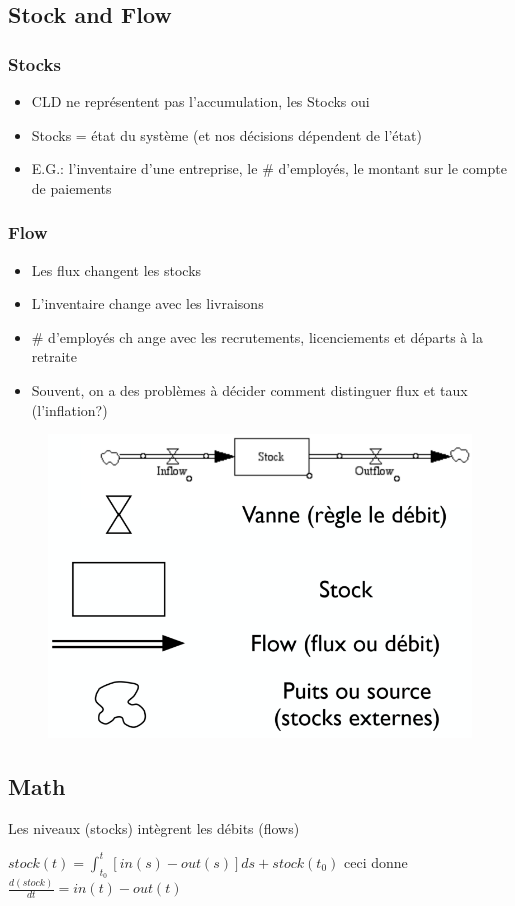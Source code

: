 \documentclass[resume]{subfiles}
\begin{document}
\subsection{Stock and Flow}

\subsubsection{Stocks}
\begin{itemize}
\item CLD ne représentent pas l'accumulation, les Stocks oui
\item Stocks = état du système (et nos décisions dépendent de
  l'état)
\item E.G.: l'inventaire d'une entreprise, le \# d'employés, le
  montant sur le compte de paiements  
\end{itemize}

\subsubsection{Flow}
\begin{itemize}
\item Les flux changent les stocks
  \item L'inventaire change avec les livraisons
  \item \# d'employés ch ange avec les recrutements, licenciements et départs à la retraite
\item Souvent, on a des problèmes à décider comment
  distinguer flux et taux (l'inflation?)  
\end{itemize}
\begin{figure}[H]
    \centering
    \includegraphics[width=0.8\columnwidth]{Figures/StockFlow.PNG}
\end{figure}


\subsection{Math}

Les niveaux (stocks) intègrent les débits (flows)

$stock(t)=\int^t_{t_0}[in(s)-out(s)]ds + stock(t_0)$ ceci donne $\frac{d(stock)}{dt}=in(t)-out(t)$ 
\end{document}
